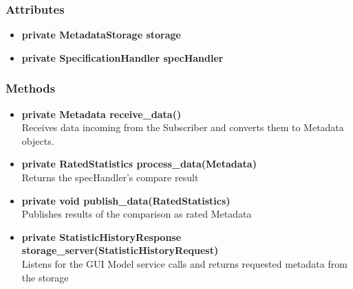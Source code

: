 \subsubsection{Attributes}
\begin{itemize}
	\item \textbf{private MetadataStorage storage}
	\item \textbf{private SpecificationHandler specHandler}
\end{itemize}
\subsubsection{Methods}
\begin{itemize}
	\item \textbf{private Metadata receive\_data()}\\
	Receives data incoming from the Subscriber and converts them to Metadata objects.
	\item \textbf{private RatedStatistics process\_data(Metadata)}\\
	Returns the specHandler's compare result
	\item \textbf{private void publish\_data(RatedStatistics)}\\
	Publishes results of the comparison as rated Metadata
	\item \textbf{private StatisticHistoryResponse storage\_server(StatisticHistoryRequest)}\\
	Listens for the GUI Model service calls and returns requested metadata from the storage
\end{itemize}

\newpage
